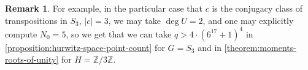 \documentclass[12 pt]{amsart}
\theoremstyle{plain}
\theoremstyle{definition}
\newtheorem{remark}[theorem]{Remark}
\theoremstyle{remark}
\numberwithin{equation}{section}
\newcommand\ZZ{\mathbb{Z}}
\begin{document}
\begin{remark}
	For example, in the particular case that $c$ is the conjugacy class of
	transpositions in $S_3$, $|c| = 3$, we may take $\deg U = 2$, 
	and one may explicitly compute $N_0 = 5$, so we get
	that we can take $q > 4 \cdot (6^{17}+1)^4$ in
	\autoref{proposition:hurwitz-space-point-count} for $G=S_3$ and in 
	\autoref{theorem:moments-roots-of-unity} for $H=\ZZ/3\ZZ$.
\end{remark}
\end{document}
